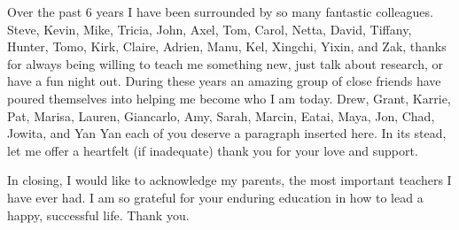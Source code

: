 Over the past 6 years I have been surrounded by so many fantastic
colleagues.  
%
Steve, Kevin, Mike, Tricia, John, Axel, Tom, Carol, Netta, David,
Tiffany, Hunter, Tomo, Kirk, Claire, Adrien, Manu, Kel, Xingchi,
Yixin, and Zak, thanks for always being willing to teach me
something new, just talk about research, or have a fun night out.
%
During these years an amazing group of close friends have poured
themselves into helping me become who I am today.
%
Drew, 
Grant, Karrie, Pat, 
%
Marisa, 
%
Lauren, 
%
Giancarlo, Amy, Sarah, 
Marcin, 
Eatai,
%
Maya,
%
Jon, Chad, Jowita, and Yan Yan each of you deserve a
paragraph inserted here.  
%
In its stead, let me offer a heartfelt (if inadequate) thank you for
your love and support.


In closing, I would like to acknowledge my parents, the most important
teachers I have ever had.
%
I am so grateful for your enduring education in how to lead a happy,
successful life.
%
Thank you.